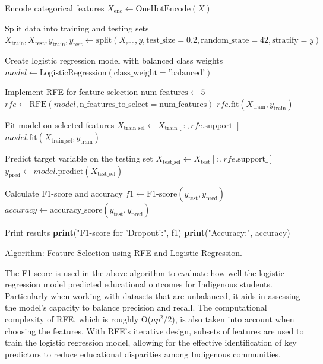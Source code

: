 \documentclass[a4paper,twoside]{article}
\begin{document}
\begin{algorithm}
    
    Encode categorical features\;
    $X_{\text{enc}} \gets \text{OneHotEncode}(X)$\;
    
    Split data into training and testing sets\;
    $X_{\text{train}}, X_{\text{test}}, y_{\text{train}}, y_{\text{test}} \gets \text{split}(X_{\text{enc}}, y, \text{test\_size} = 0.2, \text{random\_state} = 42, \text{stratify} = y)$\;
    
    Create logistic regression model with balanced class weights\;
    $model \gets \text{LogisticRegression}(\text{class\_weight} = \text{'balanced'})$\;
    
    Implement RFE for feature selection\;
    $\text{num\_features} \gets 5$\;
    $rfe \gets \text{RFE}(model, \text{n\_features\_to\_select} = \text{num\_features})$\;
    $rfe.\text{fit}(X_{\text{train}}, y_{\text{train}})$\;
    
    Fit model on selected features\;
    $X_{\text{train\_sel}} \gets X_{\text{train}}[:, rfe.\text{support\_}]$\;
    $model.\text{fit}(X_{\text{train\_sel}}, y_{\text{train}})$\;
    
    Predict target variable on the testing set\;
    $X_{\text{test\_sel}} \gets X_{\text{test}}[:, rfe.\text{support\_}]$\;
    $y_{\text{pred}} \gets model.\text{predict}(X_{\text{test\_sel}})$\;
    
    Calculate F1-score and accuracy\;
    $f1 \gets \text{F1-score}(y_{\text{test}}, y_{\text{pred}})$\;
    $accuracy \gets \text{accuracy\_score}(y_{\text{test}}, y_{\text{pred}})$\;
    
    Print results\;
    \textbf{print}("F1-score for 'Dropout':", f1)\;
    \textbf{print}("Accuracy:", accuracy)\;

    \caption{Algorithm: Feature Selection using RFE and Logistic Regression.}
\end{algorithm}

The F1-score is used in the above algorithm to evaluate how well the
logistic regression model predicted educational outcomes for Indigenous students. Particularly when working with datasets that are unbalanced, it aids in assessing the model’s capacity to balance precision and recall. The computational complexity of RFE, which is roughly O($np^2/2$), is also taken into account when choosing the features. With RFE’s iterative design, subsets of features are used to train the logistic regression model, allowing for the effective identification of key predictors to reduce educational disparities among Indigenous communities.
\end{document}
